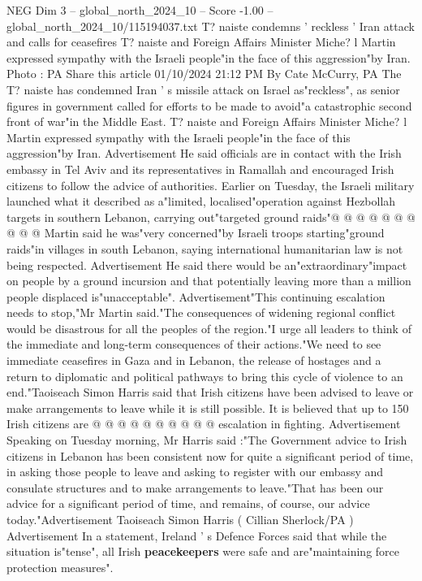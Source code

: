 \begin{textsample}{NEG Dim 3 – global\_north\_2024\_10 – Score -1.00 – global\_north\_2024\_10/115194037.txt}  \label{ex:f3_neg_309}
T? naiste condemns ' reckless ' Iran attack and calls for ceasefires T? naiste and Foreign Affairs Minister Miche? l Martin expressed sympathy with the Israeli people"in the face of this aggression"by Iran.
Photo : PA Share this article 01/10/2024 21:12 PM By Cate McCurry, PA The T? naiste has condemned Iran ' s missile attack on Israel as"reckless", as senior figures in government called for efforts to be made to avoid"a catastrophic second front of war"in the Middle East.
T? naiste and Foreign Affairs Minister Miche? l Martin expressed sympathy with the Israeli people"in the face of this aggression"by Iran.
Advertisement He said officials are in contact with the Irish embassy in Tel Aviv and its representatives in Ramallah and encouraged Irish citizens to follow the advice of authorities.
Earlier on Tuesday, the Israeli military launched what it described as a"limited, localised"operation against Hezbollah targets in southern Lebanon, carrying out"targeted ground raids"@ @ @ @ @ @ @ @ @ @ Martin said he was"very concerned"by Israeli troops starting"ground raids"in villages in south Lebanon, saying international humanitarian law is not being respected.
Advertisement He said there would be an"extraordinary"impact on people by a ground incursion and that potentially leaving more than a million people displaced is"unacceptable".
Advertisement"This continuing escalation needs to stop,"Mr Martin said."The consequences of widening regional conflict would be disastrous for all the peoples of the region."I urge all leaders to think of the immediate and long-term consequences of their actions."We need to see immediate ceasefires in Gaza and in Lebanon, the release of hostages and a return to diplomatic and political pathways to bring this cycle of violence to an end."Taoiseach Simon Harris said that Irish citizens have been advised to leave or make arrangements to leave while it is still possible.
It is believed that up to 150 Irish citizens are @ @ @ @ @ @ @ @ @ @ escalation in fighting.
Advertisement Speaking on Tuesday morning, Mr Harris said :"The Government advice to Irish citizens in Lebanon has been consistent now for quite a significant period of time, in asking those people to leave and asking to register with our embassy and consulate structures and to make arrangements to leave."That has been our advice for a significant period of time, and remains, of course, our advice today."Advertisement Taoiseach Simon Harris ( Cillian Sherlock/PA ) Advertisement In a statement, Ireland ' s Defence Forces said that while the situation is"tense", all Irish \textbf{peacekeepers} were safe and are"maintaining force protection measures".

\end{textsample}
